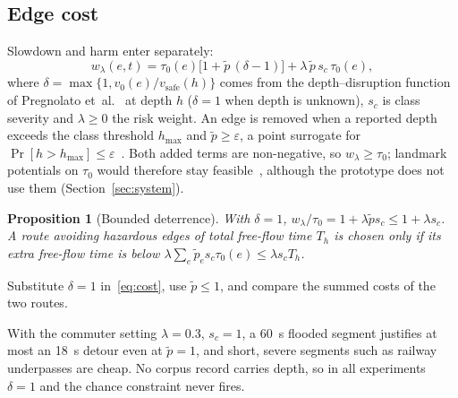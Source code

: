 \documentclass[conference]{IEEEtran}
\newtheorem{proposition}{Proposition}
\begin{document}
\subsection{Edge cost}
Slowdown and harm enter separately:
\begin{equation}
w_\lambda(e,t)=\tau_0(e)\big[1+\tilde p\,(\delta-1)\big] + \lambda\,\tilde p\,s_c\,\tau_0(e), \label{eq:cost}
\end{equation}
where $\delta=\max\{1, v_0(e)/v_{\mathrm{safe}}(h)\}$ comes from the depth--disruption function of Pregnolato et~al.~\cite{pregnolato2017depth} at depth $h$ ($\delta=1$ when depth is unknown), $s_c$ is class severity and $\lambda\ge0$ the risk weight. An edge is removed when a reported depth exceeds the class threshold $h_{\max}$ and $\tilde p\ge\varepsilon$, a point surrogate for $\Pr[h>h_{\max}]\le\varepsilon$~\cite{charnes1959chance}. Both added terms are non-negative, so $w_\lambda\ge\tau_0$; landmark potentials on $\tau_0$ would therefore stay feasible~\cite{delling2007landmark}, although the prototype does not use them (Section~\ref{sec:system}).

\begin{proposition}[Bounded deterrence]\label{prop:cap}
With $\delta=1$, $w_\lambda/\tau_0=1+\lambda\tilde p s_c\le1+\lambda s_c$. A route avoiding hazardous edges of total free-flow time $T_h$ is chosen only if its extra free-flow time is below $\lambda\sum_e\tilde p_e s_c\tau_0(e)\le\lambda s_cT_h$.
\end{proposition}
\begin{IEEEproof}
Substitute $\delta=1$ in~\eqref{eq:cost}, use $\tilde p\le1$, and compare the summed costs of the two routes.
\end{IEEEproof}
With the commuter setting $\lambda=0.3$, $s_c=1$, a 60~s flooded segment justifies at most an 18~s detour even at $\tilde p=1$, and short, severe segments such as railway underpasses are cheap. No corpus record carries depth, so in all experiments $\delta=1$ and the chance constraint never fires.
\end{document}
